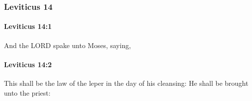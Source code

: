 	\subsubsection{Leviticus 14} %
		\label{LEVITICUS-14}

		\paragraph{Leviticus 14:1} %
			\label{LEVITICUS-14-1}

			And the LORD spake unto Moses, saying,


		\paragraph{Leviticus 14:2} %
			\label{LEVITICUS-14-2}

			This shall be the law of the leper in the day of his cleansing: He shall be brought unto the priest:

